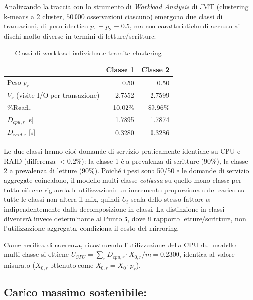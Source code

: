 \documentclass[11pt,a4paper]{article}
\begin{document}
Analizzando la traccia con lo strumento di \emph{Workload Analysis} di JMT (clustering k-means a
2 cluster, $50\,000$ osservazioni ciascuno) emergono due classi di transazioni, di peso identico
$p_1=p_2=0.5$, ma con caratteristiche di accesso ai dischi molto diverse in termini di
letture/scritture:

\begin{table}[h]
\centering
\caption{Classi di workload individuate tramite clustering}
\label{tab:classi}
\begin{tabular}{lrr}
\toprule
 & Classe 1 & Classe 2 \\
\midrule
Peso $p_r$ & 0.50 & 0.50 \\
$V_r$ (visite I/O per transazione) & 2.7552 & 2.7599 \\
\%Read$_r$ & 10.02\% & 89.96\% \\
$D_{cpu,r}$ [s] & 1.7895 & 1.7874 \\
$D_{raid,r}$ [s] & 0.3280 & 0.3286 \\
\bottomrule
\end{tabular}
\end{table}

Le due classi hanno cioè domande di servizio praticamente identiche su CPU e RAID (differenza
$<0.2\%$): la classe 1 è a prevalenza di scritture (90\%), la classe 2 a prevalenza di letture (90\%).
Poiché i pesi sono 50/50 e le domande di servizio aggregate coincidono, il modello multi-classe
\emph{collassa} su quello mono-classe per tutto ciò che riguarda le utilizzazioni: un incremento
proporzionale del carico su tutte le classi non altera il mix, quindi $U_i$ scala dello stesso fattore
$\alpha$ indipendentemente dalla decomposizione in classi. La distinzione in classi diventerà invece
determinante al Punto 3, dove il rapporto letture/scritture, non l'utilizzazione aggregata,
condiziona il costo del mirroring.

Come verifica di coerenza, ricostruendo l'utilizzazione della CPU dal modello multi-classe si
ottiene $U_{CPU}=\sum_r D_{cpu,r}\cdot X_{0,r}/m = 0.2300$, identica al valore misurato ($X_{0,r}$ ottenuto come $X_{0,r} = X_0\cdot p_r$).

\subsection{Carico massimo sostenibile:}
\end{document}
